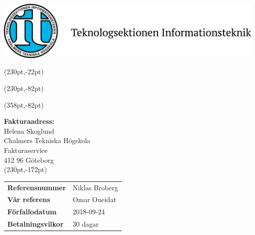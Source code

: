 \documentclass[a4paper,11pt]{article}
\begin{document}
\pagestyle{fancy}
\fancyhf{} %
\renewcommand{\headrulewidth}{0pt}
\renewcommand{\footrulewidth}{0pt}

\setlength{\fboxsep}{1.5em}
\setlength{\parindent}{0pt}

{\includegraphics[height=3\baselineskip]{sektionslogo.png}}



\fancyput*(230pt,-22pt){}

\fancyput*(230pt,-82pt){}

\fancyput*(358pt,-82pt){}

\vspace{3em}
\textbf{Fakturaadress:}\\[1em]
Helena Skoglund\\
Chalmers Tekniska Högskola\\
Fakturaservice\\
412 96 Göteborg\\



\fancyput*(230pt,-172pt){
    \begin{minipage}{85pt}
      \begin{tabular}{ll}
        \textbf{Referensnummer} & Niklas Broberg\\
        \textbf{Vår referens} & Omar Oueidat \\
        \textbf{Förfallodatum} & 2018-09-24\\
        \textbf{Betalningsvilkor} & 30 dagar
      \end{tabular}
    \end{minipage}}
\end{document}
